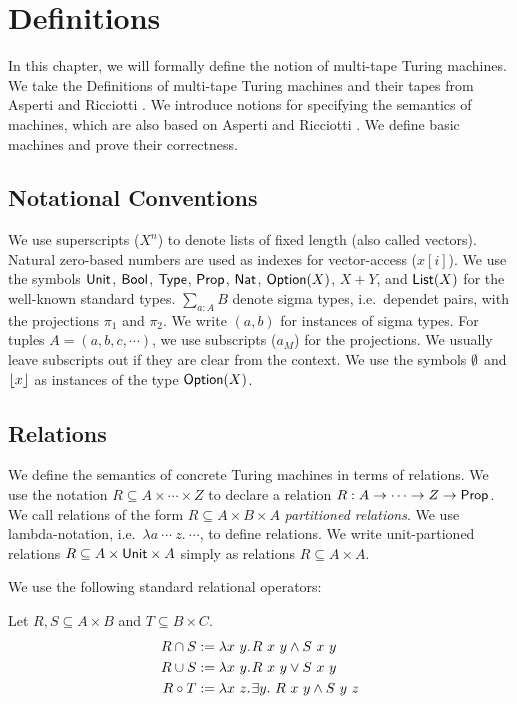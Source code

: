 \chapter{Definitions}
\label{chap:definitions}

In this chapter, we will formally define the notion of multi-tape Turing machines.  We take the Definitions of multi-tape Turing machines and their
tapes from Asperti and Ricciotti \cite{asperti2015}.  We introduce notions for specifying the semantics of machines, which are also based on Asperti
and Ricciotti \cite{asperti2015}.  We define basic machines and prove their correctness.


\section{Notational Conventions}
\label{sec:notational-conventions}

We use superscripts ($X^n$) to denote lists of fixed length (also called vectors).  Natural zero-based numbers are used as indexes for vector-access
($x[i]$).  We use the symbols $\textsf{Unit}$, $\textsf{Bool}$, $\textsf{Type}$, $\textsf{Prop}$, $\textsf{Nat}$, $\textsf{Option}(X)$, $X+Y$, and $\textsf{List}(X)$ for the well-known standard types.
$\sum_{a:A} B$ denote sigma types, i.e.\ dependet pairs, with the projections $\pi_1$ and $\pi_2$.  We write $(a,b)$ for instances of sigma types. For
tuples $A = (a, b, c, \cdots)$, we use subscripts ($a_M$) for the projections.  We usually leave subscripts out if they are clear from the context.
We use the symbols $\emptyset$ and $\left\lfloor {x}\right\rfloor$ as instances of the type $\textsf{Option}(X)$.


\section{Relations}
\label{sec:relations}

We define the semantics of concrete Turing machines in terms of relations.  We use the notation $R \subseteq A \times \cdots \times Z$ to declare a
relation $R : A \rightarrow \cdots \rightarrow Z \rightarrow \textsf{Prop}$.  We call relations of the form $R \subseteq A \times B \times A$ \emph{partitioned relations}.  We
use lambda-notation, i.e.\ $\lambda a~\cdots~z.~\cdots$, to define relations.  We write unit-partioned relations $R \subseteq A \times \textsf{Unit} \times A$
simply as relations $R \subseteq A \times A$.

We use the following standard relational operators:

\begin{definition}
  Let $R, S \subseteq A \times B$ and $T \subseteq B \times C$.
  \begin{align*}
    R \cap S &:= \lambda x~y{.}\hskip.7ptR~x~y \land S~x~y \\
    R \cup S &:= \lambda x~y{.}\hskip.7ptR~x~y \lor S~x~y \\
    R \circ T &:= \lambda x~z{.}\hskip.7pt\exists y.~R~x~y \land S~y~z
  \end{align*}
\end{definition}

